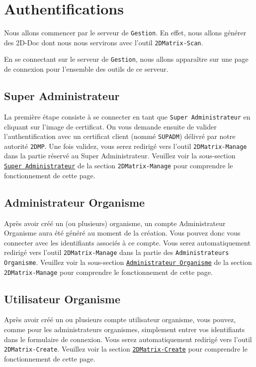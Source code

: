 \section{Authentifications}
Nous allons commencer par le serveur de \texttt{Gestion}. En effet, nous allons générer des 2D-Doc dont nous nous servirons avec l'outil \texttt{2DMatrix-Scan}.

En se connectant sur le serveur de \texttt{Gestion}, nous allons apparaître sur une page de connexion pour l'ensemble des outils de ce serveur.

\subsection{Super Administrateur}

La première étape consiste à se connecter en tant que \texttt{Super Administrateur} en cliquant sur l'image de certificat. On vous demande ensuite de valider l'authentification avec un certificat client (nommé \texttt{SUPADM}) délivré par notre autorité \texttt{2DMP}. Une fois validez, vous serez redirigé vers l'outil \texttt{2DMatrix-Manage} dans la partie réservé au Super Administrateur. Veuillez voir la sous-section \hyperref[managesupadm]{\texttt{Super Administrateur}} de la section \texttt{2DMatrix-Manage} pour comprendre le fonctionnement de cette page. 

\subsection{Administrateur Organisme}

Après avoir créé un (ou plusieurs) organisme, un compte Administrateur Organisme aura été généré au moment de la création. Vous pouvez donc vous connecter avec les identifiants associés à ce compte. Vous serez automatiquement redirigé vers l'outil \texttt{2DMatrix-Manage} dans la partie des \texttt{Administrateurs Organisme}. Veuillez voir la sous-section \hyperref[manageadmorga]{\texttt{Administrateur Organisme}} de la section \texttt{2DMatrix-Manage} pour comprendre le fonctionnement de cette page. 

\subsection{Utilisateur Organisme}

Après avoir créé un ou plusieurs compte utilisateur organisme, vous pouvez, comme pour les administrateurs organismes, simplement entrer vos identifiants dans le formulaire de connexion. Vous serez automatiquement redirigé vers l'outil \texttt{2DMatrix-Create}. Veuillez voir la section \hyperref[create]{\texttt{2DMatrix-Create}} pour comprendre le fonctionnement de cette page. 